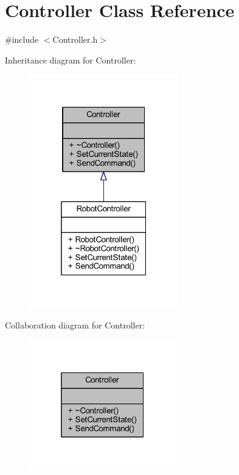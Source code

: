 \hypertarget{class_controller}{}\section{Controller Class Reference}
\label{class_controller}


{\ttfamily \#include $<$Controller.\+h$>$}



Inheritance diagram for Controller\+:
\nopagebreak
\begin{figure}[H]
\begin{center}
\leavevmode
\includegraphics[width=184pt]{class_controller__inherit__graph}
\end{center}
\end{figure}


Collaboration diagram for Controller\+:
\nopagebreak
\begin{figure}[H]
\begin{center}
\leavevmode
\includegraphics[width=181pt]{class_controller__coll__graph}
\end{center}
\end{figure}
